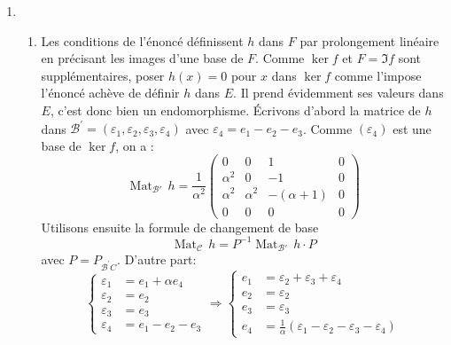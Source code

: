 \begin{enumerate}
\item 
\begin{enumerate}
\item Les conditions de l'\'{e}nonc\'{e} d\'{e}finissent $h$ dans $F$ par prolongement linéaire en précisant les images d'une base de $F$. Comme $\ker f$ et $F=\Im f$ sont suppl\'{e}mentaires, poser $h(x)=0$ pour $x$ dans $\ker f$ comme l'impose l'énoncé achève de définir $h$ dans $E$. Il prend évidemment ses valeurs dans $E$, c'est donc bien un endomorphisme.\newline
\'Ecrivons d'abord la matrice de $h$ dans $\mathcal{B}^{\prime }=(\varepsilon_{1}, \varepsilon_{2}, \varepsilon_{3},\varepsilon_{4})$ avec $\varepsilon_{4}=e_{1}-e_{2}-e_{3}$. Comme $(\varepsilon_{4})$ est une base de $\ker f$, on a : 
\[
\mathop{\mathrm{Mat}}_{\mathcal B'}\,h=\frac{1}{\alpha ^{2}}\left( 
\begin{array}{cccc}
0 & 0 & 1 & 0 \\ 
\alpha ^{2} & 0 & -1 & 0 \\ 
\alpha ^{2} & \alpha ^{2} & -(\alpha +1) & 0 \\ 
0 & 0 & 0 & 0
\end{array}
\right) 
\]
Utilisons ensuite la formule de changement de base $$\mathop{\mathrm{Mat}}_{\mathcal C}\,h=P^{-1}\mathop{\mathrm{Mat}}_{\mathcal B'}\,h\cdot P$$
avec $P=P_{\mathcal{B}^{\prime }C}$. D'autre part: 
\begin{displaymath}
\left\{ \begin{aligned}
\varepsilon _{1} &=  e_{1}+\alpha e_{4} \\ 
\varepsilon _{2} &=  e_{2} \\ 
\varepsilon _{3} &=  e_{3} \\ 
\varepsilon _{4} &=  e_{1}-e_{2}-e_{3}
\end{aligned}
\right. \Rightarrow \left\{ 
\begin{aligned}
e_{1} &=  \varepsilon _{2}+\varepsilon _{3}+\varepsilon _{4} \\ 
e_{2} &= \varepsilon _{2} \\ 
e_{3} &= \varepsilon _{3} \\ 
e_{4} &= \frac{1}{\alpha }(\varepsilon _{1}-\varepsilon _{2}-\varepsilon_{3}-\varepsilon _{4})
\end{aligned}
\right. 
\end{displaymath}


\end{enumerate}
\end{enumerate}
